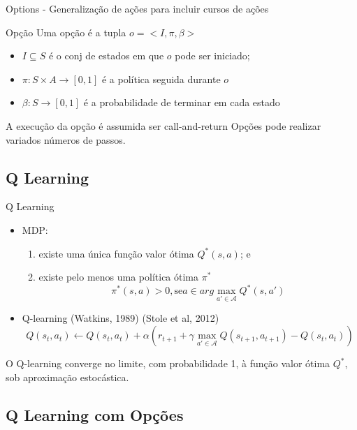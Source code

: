 \begin{frame}{Options - Generalização de ações para incluir cursos de ações \nocite{SatinderSingh}}
    \begin{block}{Opção}
        Uma opção é a tupla $o = <I, \pi, \beta>$
        \begin{itemize}
            \item $I \subseteq S$ é o conj de estados em que $o$ pode ser iniciado;
            \item $\pi:S \times A \rightarrow [0,1]$ é a política seguida durante $o$
            \item $\beta:S \rightarrow [0,1]$ é a probabilidade de terminar em cada estado
        \end{itemize}
    \end{block}
    \begin{block}{}
    A execução da opção é assumida ser \alert{call-and-return}
    Opções pode realizar variados números de passos.
    \end{block}
\end{frame}

\subsection{Q Learning}
\begin{frame}{Q Learning}
    \begin{itemize}
        \item MDP:
        \begin{enumerate}
            \item existe uma única função valor ótima $Q^*(s,a)$; e
            \item existe pelo menos uma política ótima $\pi^*$
            $$\pi^*(s,a) > 0, \text{se} a \in arg \max_{a' \in \mathcal{A}}Q^*(s,a')$$
        \end{enumerate}
        \item Q-learning (Watkins, 1989) (Stole et al, 2012) \nocite{stolle2002learning}
        $$Q(s_t,a_t) \leftarrow Q(s_t, a_t) + \alpha(r_{t+1} + \gamma \max_{a' \in \mathcal{A}}Q(s_{t+1},a_{t+1}) - Q(s_t, a_t)) $$
    \end{itemize}
    \vspace{20}
    \centering
    \alert{O Q-learning converge no limite, com probabilidade 1, à função valor ótima $Q^*$, sob aproximação estocástica.}
\end{frame}

\subsection{Q Learning com Opções}

